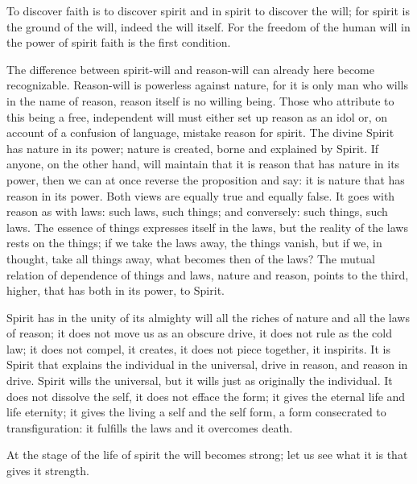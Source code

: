 \documentclass[12pt,a4paper,openany]{book}
\newcommand{\opage}[1]{\marginnote{\footnotesize\textit{[#1]}}}
\begin{document}
To discover faith is to discover spirit and in spirit to discover the will; for spirit is the ground of the will, indeed the will
\setcounter{footnote}{0}%
\opage{44}itself. For the freedom of the human will in the power of spirit faith is the first condition.

The difference between spirit-will and reason-will can already here become recognizable. Reason-will is powerless against
nature, for it is only man who wills in the name of reason, reason itself is no willing being. Those who attribute to this
being a free, independent will must either set up reason as an idol or, on account of a confusion of language, mistake reason
for spirit. The divine Spirit has nature in its power; nature is created, borne and explained by Spirit. If anyone, on the
other hand, will maintain that it is reason that has nature in its power, then we can at once reverse the proposition and say:
it is nature that has reason in its power. Both views are equally true and equally false. It goes with reason as with laws:
such laws, such things; and conversely: such things, such laws. The essence of things expresses itself in the laws, but the
reality of the laws rests on the things; if we take the laws away, the things vanish, but if we, in thought, take all things
away, what becomes then of the laws? The mutual relation of dependence of things and laws, nature and reason, points to the
third, higher, that has both in its power, to Spirit.

Spirit has in the unity of its almighty will all the riches of nature and all the laws of reason; it does not move us as an
obscure drive, it does not rule as the cold law; it does not compel, it creates, it does not piece together, it inspirits.
It is Spirit that explains the individual in the universal, drive in reason, and reason in drive. Spirit wills the universal,
but it wills just as originally the individual. It does not dissolve the self, it does not efface the form; it gives the
eternal life and life eternity; it gives the living a self and the self
 form, a form consecrated to transfiguration: it fulfills the laws and it overcomes death.

At the stage of the life of spirit the will becomes strong; let us see what it is that gives it strength.
\end{document}
